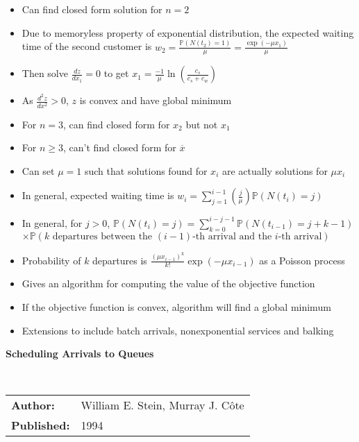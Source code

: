 \documentclass{article}
\begin{document}
\begin{itemize}
    \item Can find closed form solution for $n = 2$
    \item Due to memoryless property of exponential distribution, the expected waiting time of the second customer is $w_{2} = \frac{\mathbb{P} (N (t_{2}) = 1)}{\mu} = \frac{\exp (- \mu x_{1})}{\mu}$
    \item Then solve $\frac{d z}{d x_{1}} = 0$ to get $x_{1} = \frac{-1}{\mu} \ln \left( \frac{c_{s}}{c_{s} + c_{w}} \right)$
    \item As $\frac{d^{2} z}{d x^{2}} > 0$, $z$ is convex and have global minimum
    \item For $n = 3$, can find closed form for $x_{2}$ but not $x_{1}$
    \item For $n \geq 3$, can't find closed form for $\overline{x}$
    \item Can set $\mu = 1$ such that solutions found for $x_{i}$ are actually solutions for $\mu x_{i}$
    \item In general, expected waiting time is $w_{i} = \sum_{j = 1}^{i - 1} \left( \frac{j}{\mu} \right) \mathbb{P} ( N (t_{i}) = j )$
    \item In general, for $j > 0$, $\mathbb{P} ( N (t_{i}) = j ) = \sum_{k = 0}^{i - j - 1} \mathbb{P} ( N (t_{i - 1}) = j + k - 1)$ \newline $\times \mathbb{P} (k \text{ departures between the } (i - 1) \text{-th arrival and the } i\text{-th arrival})$
    \item Probability of $k$ departures is $\frac{(\mu x_{i - 1})^{k}}{k!} \exp (- \mu x_{i - 1})$ as a Poisson process
    \item Gives an algorithm for computing the value of the objective function
    \item If the objective function is convex, algorithm will find a global minimum
    \item Extensions to include batch arrivals, nonexponential services and balking
\end{itemize}

\textbf{Scheduling Arrivals to Queues}

\ \newline

\begin{tabular}{l l}
    \textbf{Author:} & William E. Stein, Murray J. C\^{o}te \\
    \textbf{Published:} & 1994 \\
\end{tabular}
\end{document}
